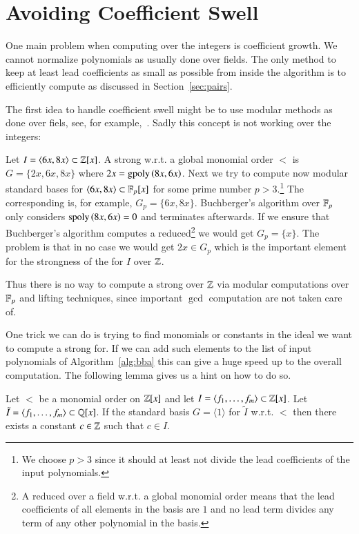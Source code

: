 \section{Avoiding Coefficient Swell}
\label{sec:coefficients}
One main problem when computing over the integers is coefficient growth. We
cannot normalize polynomials as usually done over fields. The only method to
keep at least lead coefficients as small as possible from inside the algorithm
is to efficiently compute \gpts as discussed in Section~\ref{sec:pairs}.

The first idea to handle coefficient swell might be to use modular methods as
done over fiels, see, for example,~\cite{arnoldModular2003}. Sadly this concept
is not working over the integers:

\begin{example}
Let $I = \langle 6x, 8x \rangle \subset \mathbb{Z}[x]$. A strong \stb w.r.t. a global
monomial order $<$ is $G = \{2x,6x,8x\}$ where $2x = \mathrm{gpoly}\left({8x},{6x}\right)$. Next we try to
compute now modular standard bases for $\langle 6x, 8x \rangle \subset \mathbb{F}_p[x]$
for some prime number $p > 3$.\footnote{We choose $p>3$ since it should at least
not divide the lead coefficients of the input polynomials.} The corresponding
\stb is, for example, $G_p = \{6x,8x\}$. Buchberger's algorithm over
$\mathbb{F}_p$ only considers $\mathrm{spoly}\left({8x},{6x}\right) = 0$ and terminates afterwards. If
we ensure that Buchberger's algorithm computes a reduced\footnote{A
reduced \stb over a field w.r.t. a global monomial order means that the lead
coefficients of all elements in the basis are $1$ and no lead term divides
any term of any other polynomial in the basis.} \stb we would get $G_p =
\{x\}$. The problem is that in no case we would get $2x \in G_p$ which is
the important element for the strongness of the \stb for $I$ over $\mathbb{Z}$.

Thus there is no way to compute a strong \stb over $\mathbb{Z}$ via modular computations
over $\mathbb{F}_p$ and lifting techniques, since important $\gcd$ computation are not
taken care of.
\end{example}

One trick we can do is trying to find monomials or constants in the ideal we
want to compute a strong \stb for. If we can add such elements to the list of
input polynomials of Algorithm~\ref{alg:bba} this can give a huge speed up to
the overall computation. The following lemma gives us a hint on how to do so.

\begin{lemma}
Let $<$ be a monomial order on $\mathbb{Z}[x]$ and let
$I=\langle f_1,\ldots, f_m\rangle \subset \mathbb{Z}[x]$. Let $\tilde I = \langle
f_1,\ldots, f_m\rangle \subset \mathbb{Q}[x]$. If the standard basis $G = \langle 1
\rangle $ for $\tilde I$ w.r.t. $<$ then there exists a constant $c \in \mathbb{Z}$
such that $c \in I$.
\label{lem:syz-coeff}
\end{lemma}

